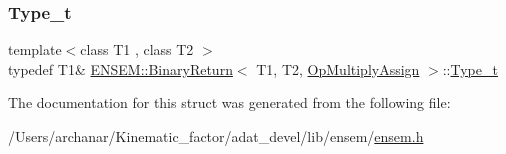 \mbox{\label{structENSEM_1_1BinaryReturn_3_01T1_00_01T2_00_01OpMultiplyAssign_01_4_adc30f204bdf8c74d41a342332a239687}} 
\subsubsection{\texorpdfstring{Type\_t}{Type\_t}\hspace{0.1cm}{\footnotesize\ttfamily [2/2]}}
{\footnotesize\ttfamily template$<$class T1 , class T2 $>$ \\
typedef T1\& \mbox{\hyperlink{structENSEM_1_1BinaryReturn}{E\+N\+S\+E\+M\+::\+Binary\+Return}}$<$ T1, T2, \mbox{\hyperlink{structENSEM_1_1OpMultiplyAssign}{Op\+Multiply\+Assign}} $>$\+::\mbox{\hyperlink{structENSEM_1_1BinaryReturn_3_01T1_00_01T2_00_01OpMultiplyAssign_01_4_adc30f204bdf8c74d41a342332a239687}{Type\+\_\+t}}}



The documentation for this struct was generated from the following file\+:\begin{DoxyCompactItemize}
\item 
/\+Users/archanar/\+Kinematic\+\_\+factor/adat\+\_\+devel/lib/ensem/\mbox{\hyperlink{lib_2ensem_2ensem_8h}{ensem.\+h}}\end{DoxyCompactItemize}
